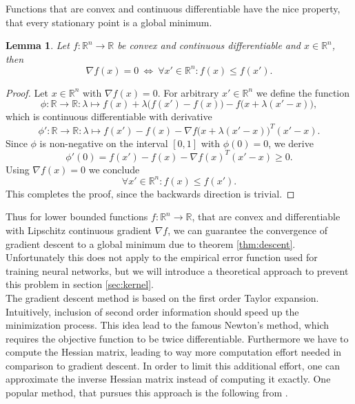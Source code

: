 \documentclass[11pt, a4paper]{article}
\newtheorem{lemma}[theorem]{Lemma}
\newcommand{\R}{\mathds{R}}
\begin{document}
Functions that are convex and continuous differentiable have the nice property, that every stationary point is a global minimum.

\begin{lemma}
Let $f: \R^n \to \R$ be convex and continuous differentiable and $x \in \R^n$, then
\[ \nabla f(x) = 0 \ \Leftrightarrow \ \forall x' \in \R^n : f(x) \leq f(x').  \]
\end{lemma}

\begin{proof}
Let $x \in \R^n$ with $\nabla f(x) = 0$. For arbitrary $x' \in \R^n$ we define the function
\[ \phi : \R \to \R : \lambda \mapsto f(x) + \lambda \big ( f(x') - f(x) \big ) - f \big ( x + \lambda (x'-x) \big ), \]
which is continuous differentiable with derivative
\[ \phi' : \R \to \R : \lambda \mapsto f(x') - f(x) - \nabla f \big (x + \lambda(x'-x)\big )^T (x'-x). \]
Since $\phi$ is non-negative on the interval $[0,1]$ with $\phi(0) = 0$, we derive
\[ \phi'(0) = f(x') - f(x) - \nabla f(x)^T (x'-x) \geq 0. \]
Using $\nabla f(x) = 0$ we conclude
\[ \forall x' \in \R^n : f(x) \leq f(x'). \]
This completes the proof, since the backwards direction is trivial.
\end{proof}

Thus for lower bounded functions $f: \R^n \to \R$, that are convex and differentiable with Lipschitz continuous gradient $\nabla f$, we can guarantee the convergence of gradient descent to a global minimum due to theorem \ref{thm:descent}. Unfortunately this does not apply to the empirical error function used for training neural networks, but we will introduce a theoretical approach to prevent this problem in section \ref{sec:kernel}. \\

The gradient descent method is based on the first order Taylor expansion. Intuitively, inclusion of second order information should speed up the minimization process. This idea lead to the famous Newton's method, which requires the objective function to be twice differentiable. Furthermore we have to compute the Hessian matrix, leading to way more computation effort needed in comparison to gradient descent. In order to limit this additional effort, one can approximate the inverse Hessian matrix instead of computing it exactly. One popular method, that pursues this approach is the following from \cite{BFGS}.
\end{document}
